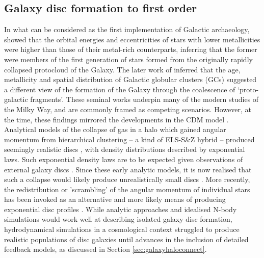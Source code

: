 \subsection{Galaxy disc formation to first order}


In what can be considered as the first implementation of Galactic archaeology, \citet[the ELS model]{1962ApJ...136..748E} showed that the orbital energies and eccentricities of stars with lower metallicities were higher than those of their metal-rich counterparts, inferring that the former were members of the first generation of stars formed from the originally rapidly collapsed protocloud of the Galaxy. The later work of \citet[the S\&Z model]{1978ApJ...225..357S} inferred that the age, metallicity and spatial distribution of Galactic globular clusters (GCs) suggested a different view of the formation of the Galaxy through the coalescence of `proto-galactic fragments'. These seminal works underpin many of the modern studies of the Milky Way, and are commonly framed as competing scenarios. However, at the time, these findings mirrored the developments in the CDM model \citep{1978MNRAS.183..341W}. Analytical models of the collapse of gas in a halo which gained angular momentum from hierarchical clustering -- a kind of ELS-S\&Z hybrid -- produced seemingly realistic discs \citep{1980MNRAS.193..189F}, with density distributions described by exponential laws. Such exponential density laws are to be expected given observations of external galaxy discs \citep[e.g.][]{1959HDP....53..311D,1970ApJ...160..811F,1983MNRAS.202.1025G,2006A&A...454..759P}. Since these early analytic models, it is now realised that such a collapse would likely produce unrealistically small discs \citep[e.g.][]{2000MNRAS.317..697E}. More recently, the redistribution or 'scrambling' of the angular momentum of individual stars has been invoked as an alternative and more likely means of producing exponential disc profiles \citep[e.g.][]{2013ApJ...775L..35E,2016ApJ...830..115E,2016arXiv161203171H}. While analytic approaches and idealised N-body simulations would work well at describing isolated galaxy disc formation, hydrodynamical simulations in a cosmological context struggled to produce realistic populations of disc galaxies until advances in the inclusion of detailed feedback models, as discussed in Section \ref{sec:galaxyhaloconnect}. 

